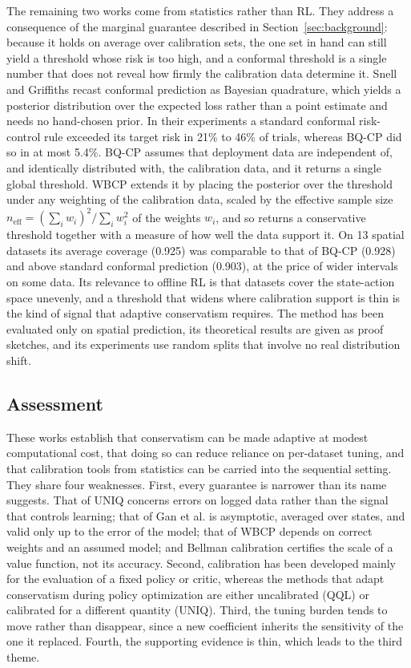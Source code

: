 \documentclass[conference]{IEEEtran}
\begin{document}
The remaining two works come from statistics rather than RL. They address a consequence of the marginal guarantee described in Section~\ref{sec:background}: because it holds on average over calibration sets, the one set in hand can still yield a threshold whose risk is too high, and a conformal threshold is a single number that does not reveal how firmly the calibration data determine it. Snell and Griffiths \cite{snell2025bqcp} recast conformal prediction as Bayesian quadrature, which yields a posterior distribution over the expected loss rather than a point estimate and needs no hand-chosen prior. In their experiments a standard conformal risk-control rule exceeded its target risk in 21\% to 46\% of trials, whereas BQ-CP did so in at most 5.4\%. BQ-CP assumes that deployment data are independent of, and identically distributed with, the calibration data, and it returns a single global threshold. WBCP \cite{lou2026wbcp} extends it by placing the posterior over the threshold under any weighting of the calibration data, scaled by the effective sample size $n_{\mathrm{eff}} = (\sum_i w_i)^2 / \sum_i w_i^2$ of the weights $w_i$, and so returns a conservative threshold together with a measure of how well the data support it. On 13 spatial datasets its average coverage (0.925) was comparable to that of BQ-CP (0.928) and above standard conformal prediction (0.903), at the price of wider intervals on some data. Its relevance to offline RL is that datasets cover the state-action space unevenly, and a threshold that widens where calibration support is thin is the kind of signal that adaptive conservatism requires. The method has been evaluated only on spatial prediction, its theoretical results are given as proof sketches, and its experiments use random splits that involve no real distribution shift.

\subsection{Assessment}
These works establish that conservatism can be made adaptive at modest computational cost, that doing so can reduce reliance on per-dataset tuning, and that calibration tools from statistics can be carried into the sequential setting. They share four weaknesses. First, every guarantee is narrower than its name suggests. That of UNIQ concerns errors on logged data rather than the signal that controls learning; that of Gan et al. is asymptotic, averaged over states, and valid only up to the error of the model; that of WBCP depends on correct weights and an assumed model; and Bellman calibration certifies the scale of a value function, not its accuracy. Second, calibration has been developed mainly for the evaluation of a fixed policy or critic, whereas the methods that adapt conservatism during policy optimization are either uncalibrated (QQL) or calibrated for a different quantity (UNIQ). Third, the tuning burden tends to move rather than disappear, since a new coefficient inherits the sensitivity of the one it replaced. Fourth, the supporting evidence is thin, which leads to the third theme.
\end{document}
